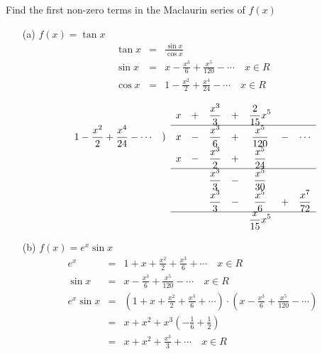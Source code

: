 \begin{eg}
Find the first non-zero terms in the Maclaurin series of \(f(x)\)

\soln
\begin{itemize}
\item[(a)]\(f(x) = \tan x\)\\
\[\begin{array}{rcl}
\tan x & = & \displaystyle \frac{\sin x}{\cos x}\\
\sin x & = & \displaystyle x - \frac{x^3}{6} + \frac{x^5}{120} - \cdots \quad x \in R\\
\cos x & = & \displaystyle 1 - \frac{x^2}{2} + \frac{x^4}{24} - \cdots \quad x \in R\\
\end{array}\]
\[\begin{array}{rccccccccc}
&& x & + & \displaystyle \frac{x^3}{3} & + & \displaystyle \frac{2}{15} x^5\\ \cline{3-9}
\displaystyle 1 - \frac{x^2}{2} + \frac{x^4}{24} - \cdots & ) & x & - & \displaystyle \frac{x^3}{6} & + & \displaystyle \frac{x^5}{120} & - & \cdots\\
&& x & - & \displaystyle \frac{x^3}{2} & + & \displaystyle \frac{x^5}{24}\\ \cline{3-9}
&&&& \displaystyle \frac{x^3}{3} & - & \displaystyle \frac{x^5}{30}\\
&&&& \displaystyle \frac{x^3}{3} & - & \displaystyle \frac{x^5}{6} & + & \displaystyle \frac{x^7}{72}\\\cline{3-9}
&&&&&& \displaystyle \frac{x}{15} x^5
\end{array}\]
\item[(b)] \(f(x) = e^x \sin x\)\\
\[\begin{array}{rcl}
e^x & = & \displaystyle 1 + x + \frac{x^2}{2} + \frac{x^3}{6} + \cdots \quad x \in R\\
\sin x & = & \displaystyle x - \frac{x^3}{6} + \frac{x^5}{120} - \cdots \quad x \in R\\
e^x \sin x & = & \displaystyle (1 + x + \frac{x^2}{2} + \frac{x^3}{6} + \cdots) \cdot (x - \frac{x^3}{6} + \frac{x^5}{120} - \cdots)\\
& = & \displaystyle x + x^2 + x^3 (- \frac{1}{6} + \frac{1}{2})\\
& = & \displaystyle x + x^2 + \frac{x^3}{3} + \cdots \quad x \in R
\end{array}\]
\end{itemize}
\end{eg}
